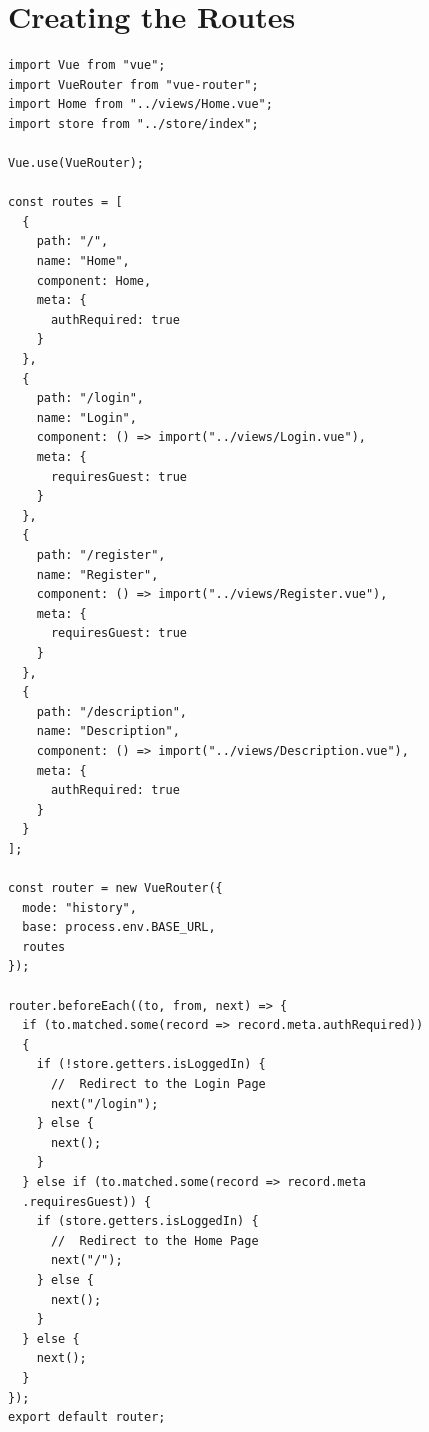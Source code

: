 \documentclass[twoside, a4paper, 12pt]{report}
\begin{document}
\section{Creating the Routes}
\begin{lstlisting}[frame=single]
import Vue from "vue";
import VueRouter from "vue-router";
import Home from "../views/Home.vue";
import store from "../store/index";

Vue.use(VueRouter);

const routes = [
  {
    path: "/",
    name: "Home",
    component: Home,
    meta: {
      authRequired: true
    }
  },
  {
    path: "/login",
    name: "Login",
    component: () => import("../views/Login.vue"),
    meta: {
      requiresGuest: true
    }
  },
  {
    path: "/register",
    name: "Register",
    component: () => import("../views/Register.vue"),
    meta: {
      requiresGuest: true
    }
  },
  {
    path: "/description",
    name: "Description",
    component: () => import("../views/Description.vue"),
    meta: {
      authRequired: true
    }
  }
];

const router = new VueRouter({
  mode: "history",
  base: process.env.BASE_URL,
  routes
});

router.beforeEach((to, from, next) => {
  if (to.matched.some(record => record.meta.authRequired)) 
  {
    if (!store.getters.isLoggedIn) {
      //  Redirect to the Login Page
      next("/login");
    } else {
      next();
    }
  } else if (to.matched.some(record => record.meta
  .requiresGuest)) {
    if (store.getters.isLoggedIn) {
      //  Redirect to the Home Page
      next("/");
    } else {
      next();
    }
  } else {
    next();
  }
});
export default router;

\end{lstlisting}

\newpage
\end{document}
